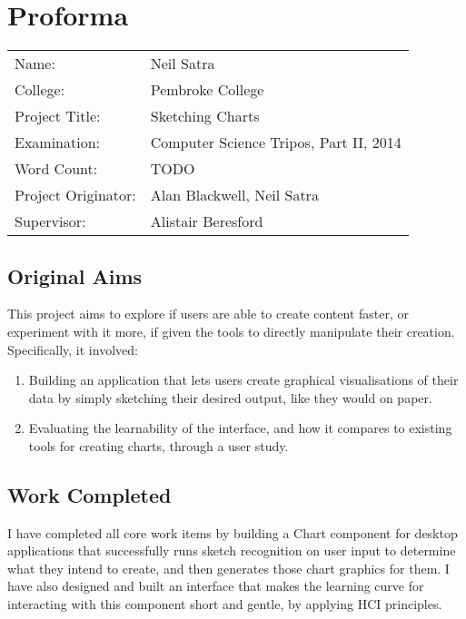 \setcounter{page}{1}
\chapter*{Proforma}

\begin{tabular}{ll}
Name:               & Neil Satra					\\
College:            & Pembroke College				\\
Project Title:      & Sketching Charts				\\
Examination:        & Computer Science Tripos, Part II, 2014        \\
Word Count:         & TODO							\\
Project Originator: & Alan Blackwell, Neil Satra        \\
Supervisor:         & Alistair Beresford				\\ 
\end{tabular}

\section*{Original Aims}
This project aims to explore if users are able to create content faster, or experiment with it more, if given the tools to directly manipulate their creation. Specifically, it involved:
\begin{enumerate}

	\item Building an application that lets users create graphical visualisations of their data by simply sketching their desired output, like they would on paper.

	\item Evaluating the learnability of the interface, and how it compares to existing tools for creating charts, through a user study.

\end{enumerate}

\section*{Work Completed}
I have completed all core work items by building a Chart component for desktop applications that successfully runs sketch recognition on user input to determine what they intend to create, and then generates those chart graphics for them. I have also designed and built an interface that makes the learning curve for interacting with this component short and gentle, by applying HCI principles. 

